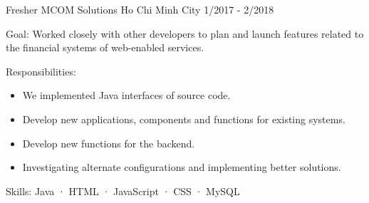   \cventry
    {Fresher} %
    {MCOM Solutions} %
    {Ho Chi Minh City} %
    {1/2017 - 2/2018} %
    {
      \begin{cvitems} %
        \item {Goal: Worked closely with other developers to plan and launch features related to the financial systems of web-enabled services.}
        \item {Responsibilities: }
        {
            \begin{itemize} %
                \item {We implemented Java interfaces of source code.}
                \item {Develop new applications, components and functions for existing systems.}
                \item {Develop new functions for the backend.}
                \item {Investigating alternate configurations and implementing better solutions.}
            \end{itemize}
        }
        \item {Skills: Java · HTML · JavaScript · CSS · MySQL}
      \end{cvitems}
    }
